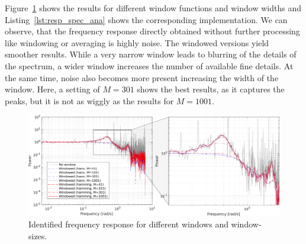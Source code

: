 \documentclass{scrartcl}
\begin{document}
Figure~\ref{fig:resp_spec_ana} shows the results for different window functions and window widths and Listing~\ref{lst:resp_spec_ana} shows the corresponding implementation.
We can observe, that the frequency response directly obtained without further processing like windowing or averaging is highly noise.
The windowed versions yield smoother results.
While a very narrow window leads to blurring of the details of the spectrum, a wider window increases the number of available fine details.
At the same time, noise also becomes more present increasing the width of the window.
Here, a setting of $M=301$ shows the best results, as it captures the peaks, but it is not as wiggly as the results for $M=1001$.
\begin{figure}[h]
	\centering
	\includegraphics[width=\textwidth]{figures/freq_resp_spec_ana.pdf}
	\caption{Identified frequency response for different windows and window-sizes.}
	\label{fig:resp_spec_ana}
\end{figure}
\end{document}
